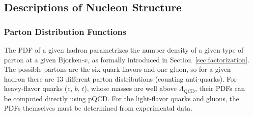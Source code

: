 \subsection{Descriptions of Nucleon Structure}
\subsubsection{Parton Distribution Functions}
The PDF of a given hadron parametrizes the number density of a given type of parton at a given Bjorken-$x$, as formally introduced in Section~\ref{sec:factorization}.
The possible partons are the six quark flavors and one gluon, so for a given hadron there are 13 different parton distributions (counting anti-quarks).
For heavy-flavor quarks ($c$, $b$, $t$), whose masses are well above $\Lambda_{\mathrm{QCD}}$, their PDFs can be computed directly using pQCD.
For the light-flavor quarks and gluons, the PDFs themselves must be determined from experimental data.

